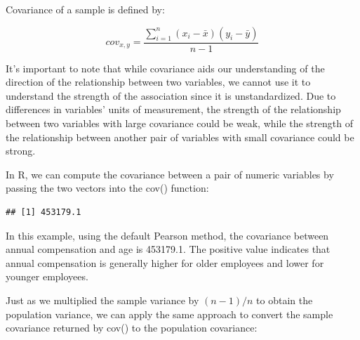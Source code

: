 \documentclass[]{book}
\newenvironment{Shaded}{\begin{snugshade}}{\end{snugshade}}
\newcommand{\CommentTok}[1]{\textcolor[rgb]{0.56,0.35,0.01}{\textit{#1}}}
\newcommand{\DataTypeTok}[1]{\textcolor[rgb]{0.13,0.29,0.53}{#1}}
\newcommand{\DecValTok}[1]{\textcolor[rgb]{0.00,0.00,0.81}{#1}}
\newcommand{\KeywordTok}[1]{\textcolor[rgb]{0.13,0.29,0.53}{\textbf{#1}}}
\newcommand{\NormalTok}[1]{#1}
\newcommand{\OperatorTok}[1]{\textcolor[rgb]{0.81,0.36,0.00}{\textbf{#1}}}
\newcommand{\StringTok}[1]{\textcolor[rgb]{0.31,0.60,0.02}{#1}}
\begin{document}
Covariance of a sample is defined by:

\[ cov_{x,y} = \frac{\displaystyle\sum_{i=1}^{n} (x_{i}-\bar{x})(y_{i}-\bar{y})}{n-1} \]

It's important to note that while covariance aids our understanding of the direction of the relationship between two variables, we cannot use it to understand the strength of the association since it is unstandardized. Due to differences in variables' units of measurement, the strength of the relationship between two variables with large covariance could be weak, while the strength of the relationship between another pair of variables with small covariance could be strong.

In R, we can compute the covariance between a pair of numeric variables by passing the two vectors into the cov() function:

\begin{Shaded}
\end{Shaded}

\begin{verbatim}
## [1] 453179.1
\end{verbatim}

In this example, using the default Pearson method, the covariance between annual compensation and age is 453179.1. The positive value indicates that annual compensation is generally higher for older employees and lower for younger employees.

Just as we multiplied the sample variance by \((n - 1) / n\) to obtain the population variance, we can apply the same approach to convert the sample covariance returned by cov() to the population covariance:

\begin{Shaded}
\end{Shaded}
\end{document}
